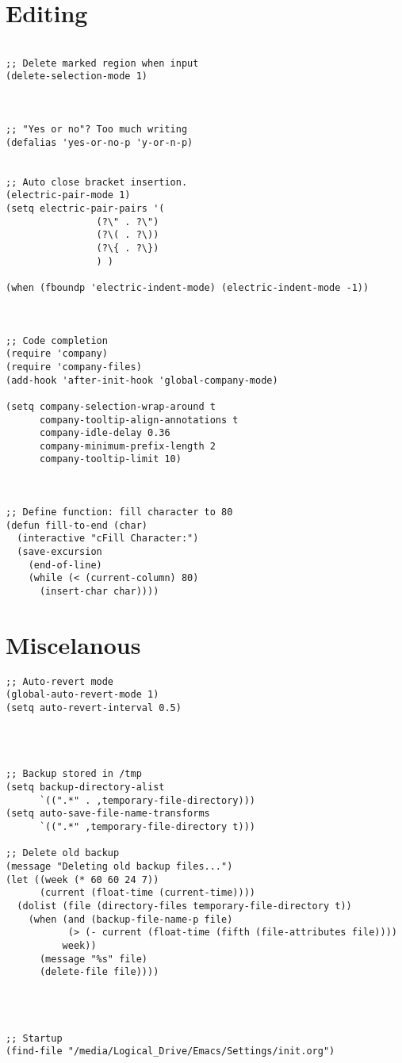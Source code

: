 \documentclass[11pt]{article}
\begin{document}
\section*{Editing}
\label{sec:org351e26a}

\begin{verbatim}

;; Delete marked region when input
(delete-selection-mode 1)



;; "Yes or no"? Too much writing
(defalias 'yes-or-no-p 'y-or-n-p)


;; Auto close bracket insertion.
(electric-pair-mode 1)
(setq electric-pair-pairs '(
			    (?\" . ?\")
			    (?\( . ?\))
			    (?\{ . ?\})
			    ) )

(when (fboundp 'electric-indent-mode) (electric-indent-mode -1))



;; Code completion
(require 'company)
(require 'company-files)
(add-hook 'after-init-hook 'global-company-mode)

(setq company-selection-wrap-around t
      company-tooltip-align-annotations t
      company-idle-delay 0.36
      company-minimum-prefix-length 2
      company-tooltip-limit 10)



;; Define function: fill character to 80
(defun fill-to-end (char)
  (interactive "cFill Character:")
  (save-excursion
    (end-of-line)
    (while (< (current-column) 80)
      (insert-char char))))

\end{verbatim}

\section*{Miscelanous}
\label{sec:orge2fe01b}
\begin{verbatim}
;; Auto-revert mode
(global-auto-revert-mode 1)
(setq auto-revert-interval 0.5)




;; Backup stored in /tmp
(setq backup-directory-alist
      `((".*" . ,temporary-file-directory)))
(setq auto-save-file-name-transforms
      `((".*" ,temporary-file-directory t)))

;; Delete old backup
(message "Deleting old backup files...")
(let ((week (* 60 60 24 7))
      (current (float-time (current-time))))
  (dolist (file (directory-files temporary-file-directory t))
    (when (and (backup-file-name-p file)
	       (> (- current (float-time (fifth (file-attributes file))))
		  week))
      (message "%s" file)
      (delete-file file))))




;; Startup
(find-file "/media/Logical_Drive/Emacs/Settings/init.org")

\end{verbatim}
\end{document}

